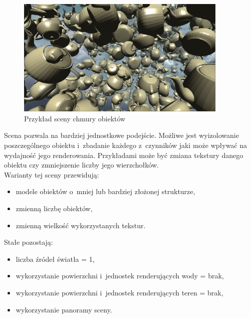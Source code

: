\documentclass[a4paper,twoside,12pt]{book}
\begin{document}
\begin{figure}[H]
    \centering
    \includegraphics[width=0.9\textwidth]{res/scene2_example.png}
    \caption{Przykład sceny chmury obiektów}
    \label{fig:scene2_example}
\end{figure}

Scena pozwala na bardziej jednostkowe podejście. Możliwe jest wyizolowanie poszczególnego obiektu i~zbadanie każdego z~czynników jaki może wpływać na wydajność jego renderowania. Przykładami może być zmiana tekstury danego obiektu czy zmniejszenie liczby jego wierzchołków. \\

Warianty tej sceny przewidują:
\begin{itemize}
    \item modele obiektów o~mniej lub bardziej złożonej strukturze,
    \item zmienną liczbę obiektów,
    \item zmienną wielkość wykorzystanych tekstur.
\end{itemize}

\vbox{}
\vbox{}

Stałe pozostają:
\begin{itemize}
    \item liczba źródeł światła = 1,
    \item wykorzystanie powierzchni i~jednostek renderujących wody = brak,
    \item wykorzystanie powierzchni i~jednostek renderujących teren = brak,
    \item wykorzystanie panoramy sceny.
\end{itemize}
\end{document}
